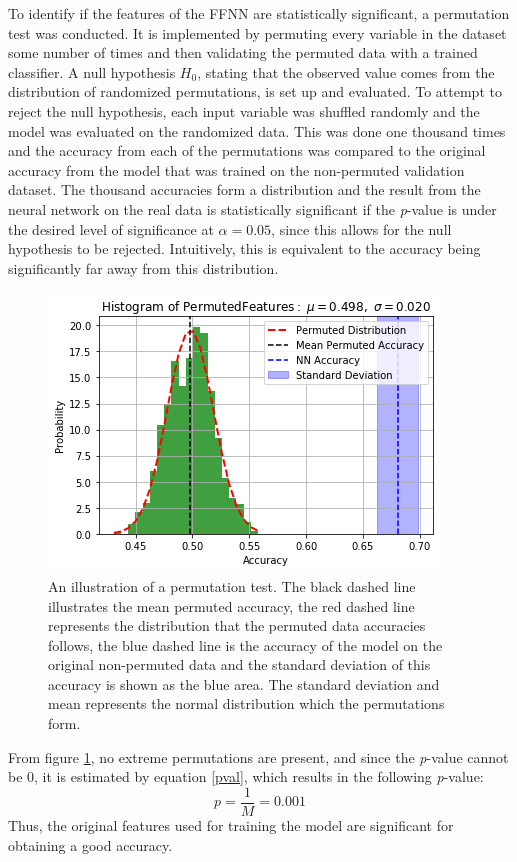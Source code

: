 \documentclass[11pt, fleqn, titlepage]{article}
\begin{document}
	To identify if the features of the FFNN are statistically significant, a permutation test was conducted. It is implemented by permuting every variable in the dataset some number of times and then validating the permuted data with a trained classifier. A null hypothesis $H_{0}$, stating that the observed value comes from the distribution of randomized permutations, is set up and evaluated. To attempt to reject the null hypothesis, each input variable was shuffled randomly and the model was evaluated on the randomized data. This was done one thousand times and the accuracy from each of the permutations was compared to the original accuracy from the model that was trained on the non-permuted validation dataset. The thousand accuracies form a distribution and the result from the neural network on the real data is statistically significant if the \textit{p}-value is under the desired level of significance at $ \alpha = 0.05 $, since this allows for the null hypothesis to be rejected. Intuitively, this is equivalent to the accuracy being significantly far away from this distribution. 
		\begin{figure}[H]
		\centering
		\includegraphics[width=0.5\linewidth]{imgs/perm_test.png}
		\caption{An illustration of a permutation test. The black dashed line illustrates the mean permuted accuracy, the red dashed line represents the distribution that the permuted data accuracies follows, the blue dashed line is the accuracy of the model on the original non-permuted data and the standard deviation of this accuracy is shown as the blue area. The standard deviation and mean represents the normal distribution which the permutations form. %
		}
		\label{fig:permtest}
	\end{figure}\noindent
	From figure \ref{fig:permtest}, no extreme permutations are present, and since the \textit{p}-value cannot be 0, it is estimated by equation \ref{pval}, which results in the following \textit{p}-value:
	\[p=\frac{1}{M}=0.001\]
	\noindent
	Thus, the original features used for training the model are significant for obtaining a good accuracy.
	\newpage
	
\end{document}
